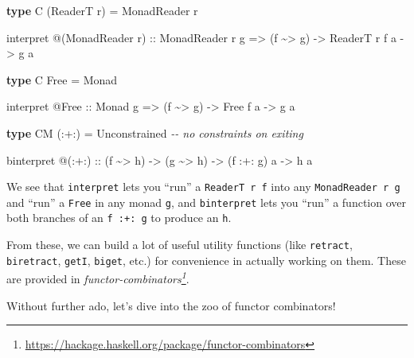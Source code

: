 \documentclass[]{article}
\newenvironment{Shaded}{}{}
\newcommand{\CommentTok}[1]{\textcolor[rgb]{0.38,0.63,0.69}{\textit{#1}}}
\newcommand{\DataTypeTok}[1]{\textcolor[rgb]{0.56,0.13,0.00}{#1}}
\newcommand{\KeywordTok}[1]{\textcolor[rgb]{0.00,0.44,0.13}{\textbf{#1}}}
\newcommand{\NormalTok}[1]{#1}
\newcommand{\OperatorTok}[1]{\textcolor[rgb]{0.40,0.40,0.40}{#1}}
\newcommand{\OtherTok}[1]{\textcolor[rgb]{0.00,0.44,0.13}{#1}}
\renewcommand{\href}[2]{#2\footnote{\url{#1}}}
\begin{document}
\begin{Shaded}
\begin{Highlighting}[]
\KeywordTok{type} \DataTypeTok{C}\NormalTok{ (}\DataTypeTok{ReaderT}\NormalTok{ r) }\OtherTok{=} \DataTypeTok{MonadReader}\NormalTok{ r}

\NormalTok{interpret }\OperatorTok{@}\NormalTok{(}\DataTypeTok{MonadReader}\NormalTok{ r)}
\OtherTok{    ::} \DataTypeTok{MonadReader}\NormalTok{ r g}
    \OtherTok{=>}\NormalTok{ (f }\OperatorTok{\textasciitilde{}>}\NormalTok{ g)}
    \OtherTok{{-}>} \DataTypeTok{ReaderT}\NormalTok{ r f a}
    \OtherTok{{-}>}\NormalTok{ g a}

\KeywordTok{type} \DataTypeTok{C} \DataTypeTok{Free} \OtherTok{=} \DataTypeTok{Monad}

\NormalTok{interpret }\OperatorTok{@}\DataTypeTok{Free}
\OtherTok{    ::} \DataTypeTok{Monad}\NormalTok{ g}
    \OtherTok{=>}\NormalTok{ (f }\OperatorTok{\textasciitilde{}>}\NormalTok{ g)}
    \OtherTok{{-}>} \DataTypeTok{Free}\NormalTok{ f a}
    \OtherTok{{-}>}\NormalTok{ g a}

\KeywordTok{type} \DataTypeTok{CM}\NormalTok{ (}\OperatorTok{:+:}\NormalTok{) }\OtherTok{=} \DataTypeTok{Unconstrained}   \CommentTok{{-}{-} no constraints on exiting}

\NormalTok{binterpret }\OperatorTok{@}\NormalTok{(}\OperatorTok{:+:}\NormalTok{)}
\OtherTok{    ::}\NormalTok{ (f }\OperatorTok{\textasciitilde{}>}\NormalTok{ h)}
    \OtherTok{{-}>}\NormalTok{ (g }\OperatorTok{\textasciitilde{}>}\NormalTok{ h)}
    \OtherTok{{-}>}\NormalTok{ (f }\OperatorTok{:+:}\NormalTok{ g) a}
    \OtherTok{{-}>}\NormalTok{ h a}
\end{Highlighting}
\end{Shaded}

We see that \texttt{interpret} lets you ``run'' a \texttt{ReaderT\ r\ f} into
any \texttt{MonadReader\ r\ g} and ``run'' a \texttt{Free} in any monad
\texttt{g}, and \texttt{binterpret} lets you ``run'' a function over both
branches of an \texttt{f\ :+:\ g} to produce an \texttt{h}.

From these, we can build a lot of useful utility functions (like
\texttt{retract}, \texttt{biretract}, \texttt{getI}, \texttt{biget}, etc.) for
convenience in actually working on them. These are provided in
\emph{\href{https://hackage.haskell.org/package/functor-combinators}{functor-combinators}}.

Without further ado, let's dive into the zoo of functor combinators!
\end{document}
